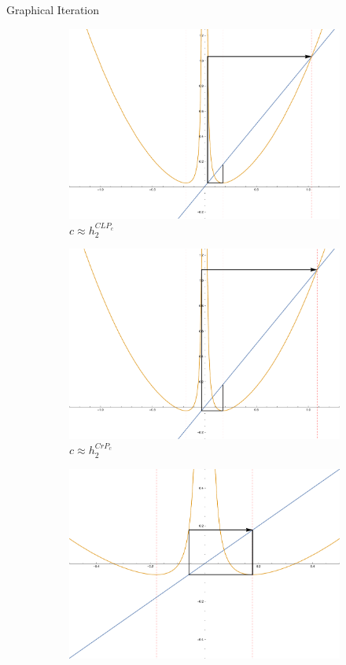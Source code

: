 \documentclass{beamer}
\newcommand{\<}{\left\langle}
\renewcommand{\>}{\right\rangle} %
\renewcommand{\*}{\cdot} %
\begin{document}
\begin{frame}{Graphical Iteration}
	\begin{figure}[h]
		\centering
		\begin{subfigure}[b]{0.4\textwidth}
				\includegraphics[width=\textwidth]{./img/it2-1}
				\caption{$c \approx h_2^{CLP_c}$}
		\end{subfigure}%
		\begin{subfigure}[b]{0.4\textwidth}
				\includegraphics[width=\textwidth]{./img/it2-2}
				\caption{$c \approx h_2^{CrP_c}$}
		\end{subfigure}
		\begin{subfigure}[b]{0.4\textwidth}
				\includegraphics[width=\textwidth]{./img/it2-3}

\end{subfigure}
\end{figure}
\end{frame}
\end{document}
